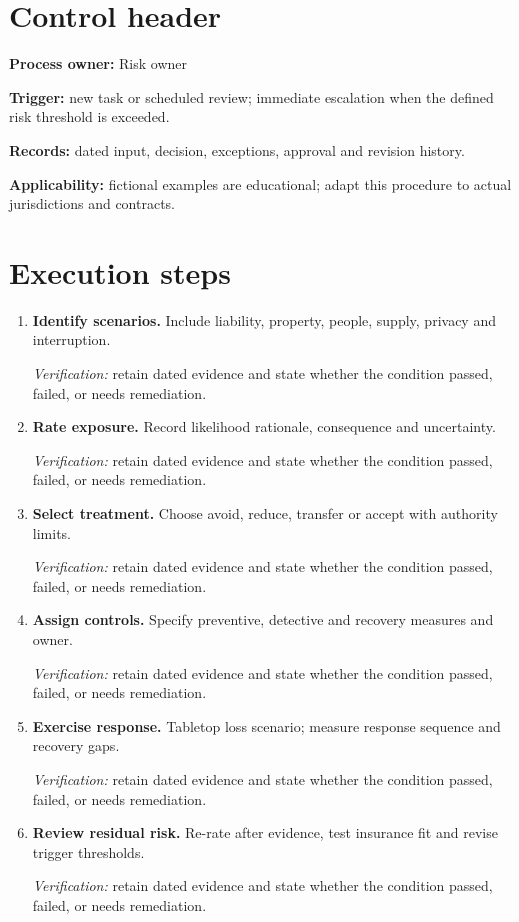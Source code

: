 \documentclass[11pt]{article}
\begin{document}
\SuiteOpen
\section{Control header}
\textbf{Process owner:} Risk owner\par\textbf{Trigger:} new task or scheduled review; immediate escalation when the defined risk threshold is exceeded.\par\textbf{Records:} dated input, decision, exceptions, approval and revision history.\par\textbf{Applicability:} fictional examples are educational; adapt this procedure to actual jurisdictions and contracts.
\section{Execution steps}
\begin{enumerate}[leftmargin=*,itemsep=8pt]
\item \textbf{Identify scenarios.} Include liability, property, people, supply, privacy and interruption.\par\textit{Verification:} retain dated evidence and state whether the condition passed, failed, or needs remediation.
\item \textbf{Rate exposure.} Record likelihood rationale, consequence and uncertainty.\par\textit{Verification:} retain dated evidence and state whether the condition passed, failed, or needs remediation.
\item \textbf{Select treatment.} Choose avoid, reduce, transfer or accept with authority limits.\par\textit{Verification:} retain dated evidence and state whether the condition passed, failed, or needs remediation.
\item \textbf{Assign controls.} Specify preventive, detective and recovery measures and owner.\par\textit{Verification:} retain dated evidence and state whether the condition passed, failed, or needs remediation.
\item \textbf{Exercise response.} Tabletop loss scenario; measure response sequence and recovery gaps.\par\textit{Verification:} retain dated evidence and state whether the condition passed, failed, or needs remediation.
\item \textbf{Review residual risk.} Re-rate after evidence, test insurance fit and revise trigger thresholds.\par\textit{Verification:} retain dated evidence and state whether the condition passed, failed, or needs remediation.
\end{enumerate}
\end{document}
